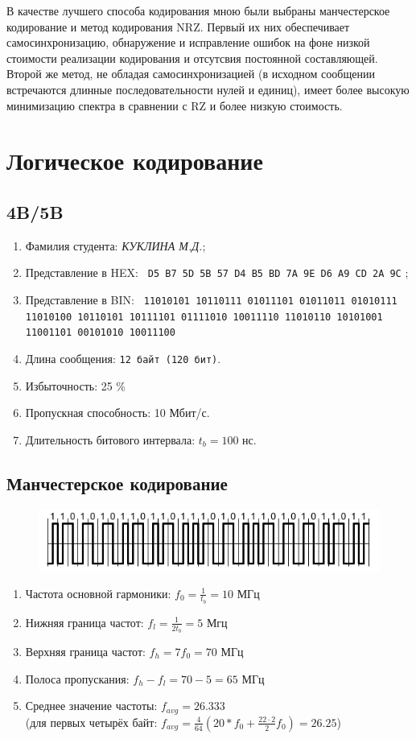 \documentclass[12pt, a4paper] {ncc}
\begin{document}
	В качестве лучшего способа кодирования мною были выбраны манчестерское кодирование и метод
	кодирования NRZ. Первый их них обеспечивает самосинхронизацию, обнаружение и исправление ошибок
	на фоне низкой стоимости реализации кодирования и отсутсвия постоянной составляющей. Второй же  
	метод, не обладая самосинхронизацией (в исходном сообщении встречаются длинные последовательности
	нулей и единиц), имеет более высокую минимизацию спектра в сравнении с RZ и более
	низкую стоимость.

\section*{Логическое кодирование}
	\subsection*{4B/5B}
    	\begin{enumerate}
            \item Фамилия студента: \textsl{КУКЛИНА М.Д.};
            \item Представление в HEX: \texttt{ D5 B7 5D 5B 57 D4 B5 BD 7A 9E D6 A9 CD 2A 9C} ;
            \item Представление в BIN: \texttt{ 11010101 10110111 01011101 01011011 01010111 11010100 10110101 10111101 01111010 10011110 11010110 10101001 11001101 00101010 10011100}
            \item Длина сообщения: \texttt{12 байт (120 бит)}.
			\item Избыточность: 25 \% 
    		\item Пропускная способность: 10 Мбит/с.
    		\item Длительность битового интервала: $t_b = 100$ нс.
        \end{enumerate}	
	\subsection*{Манчестерское кодирование}
		\begin{figure}[h!]
			\includegraphics{../img/ManchesterLog.png}
		\end{figure}
		\begin{enumerate}
			\item Частота основной гармоники: $f_0 = \frac {1} {t_b} = 10$ МГц 
			\item Нижняя граница частот: $f_l = \frac {1} {2t_b} = 5$ Мгц
			\item Верхняя граница частот: $f_h = 7f_0 = 70$ МГц
			\item Полоса пропускания: $f_h - f_l = 70 - 5 = 65$ МГц 
			\item Среднее значение частоты: $f_{avg} = 26.333$ \\
				  (для первых четырёх байт: $f_{avg} = \frac {4} {64} (20*f_0 + \frac {22 \cdot 2} {2} f_0) = 26.25 $)
		\end{enumerate}
\end{document}
